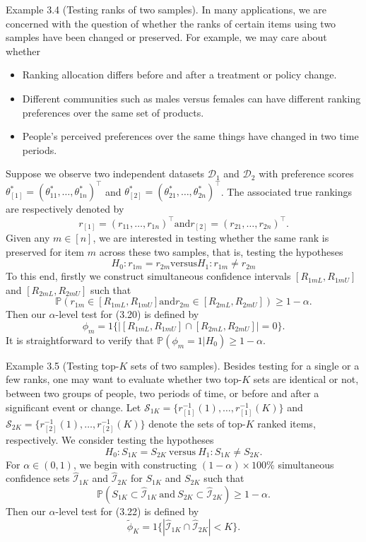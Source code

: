 Example 3.4 (Testing ranks of two samples). In many applications, we are concerned with the question of whether the ranks of certain items using two samples have been changed or preserved. For example, we may care about whether
\begin{itemize}
\tightlist
\item
  Ranking allocation differs before and after a treatment or policy change.
\item
  Different communities such as males versus females can have different ranking preferences over the same set of products.
\item
  People's perceived preferences over the same things have changed in two time periods.
\end{itemize}
Suppose we observe two independent datasets \(\mathcal{D}_1\) and \(\mathcal{D}_2\) with preference scores \(\theta_{[1]}^{*} = (\theta_{11}^{*},\ldots ,\theta_{1n}^{*})^{\top}\) and \(\theta_{[2]}^{*} = (\theta_{21}^{*},\ldots ,\theta_{2n}^{*})^{\top}\). The associated true rankings are respectively denoted by
\[
r_{[1]} = (r_{11},\ldots ,r_{1n})^{\top} \text{and} r_{[2]} = (r_{21},\ldots ,r_{2n})^{\top}.
\]
Given any \(m\in [n]\), we are interested in testing whether the same rank is preserved for item \(m\) across these two samples, that is, testing the hypotheses
\[
H_{0}:r_{1m} = r_{2m} \text{versus} H_{1}:r_{1m}\neq r_{2m} \tag{3.20}
\]
To this end, firstly we construct simultaneous confidence intervals \([R_{1mL},R_{1mU}]\) and \([R_{2mL},R_{2mU}]\) such that
\[
\mathbb{P}(r_{1m}\in [R_{1mL},R_{1mU}]\text{and} r_{2m}\in [R_{2mL},R_{2mU}])\geq 1 - \alpha . \tag{3.21}
\]
Then our \(\alpha\)-level test for (3.20) is defined by
\[
\phi_{m} = 1\{|[R_{1mL},R_{1mU}]\cap [R_{2mL},R_{2mU}]| = 0\} .
\]
It is straightforward to verify that \(\mathbb{P}(\phi_{m} = 1|H_{0})\geq 1 - \alpha\).

Example 3.5 (Testing top-\(K\) sets of two samples). Besides testing for a single or a few ranks, one may want to evaluate whether two top-\(K\) sets are identical or not, between two groups of people, two periods of time, or before and after a significant event or change. Let \(\mathcal{S}_{1K} = \{r_{[1]}^{- 1}(1),\ldots ,r_{[1]}^{- 1}(K)\}\) and \(\mathcal{S}_{2K} = \{r_{[2]}^{- 1}(1),\ldots ,r_{[2]}^{- 1}(K)\}\) denote the sets of top-\(K\) ranked items, respectively. We consider testing the hypotheses
\[
H_{0}:S_{1K} = S_{2K}\mathrm{~versus~}H_{1}:S_{1K}\neq S_{2K}. \tag{3.22}
\]
For \(\alpha \in (0,1)\), we begin with constructing \((1 - \alpha)\times 100\%\) simultaneous confidence sets \(\widehat{\mathcal{I}}_{1K}\) and \(\widehat{\mathcal{I}}_{2K}\) for \(S_{1K}\) and \(S_{2K}\) such that
\[
\mathbb{P}\left(S_{1K}\subset \widehat{\mathcal{I}}_{1K}\mathrm{~and~}S_{2K}\subset \widehat{\mathcal{I}}_{2K}\right)\geq 1 - \alpha . \tag{3.23}
\]
Then our \(\alpha\)-level test for (3.22) is defined by
\[
\widetilde{\phi}_{K} = 1\{|\widehat{\mathcal{I}}_{1K}\cap \widehat{\mathcal{I}}_{2K}|< K\} .
\]

